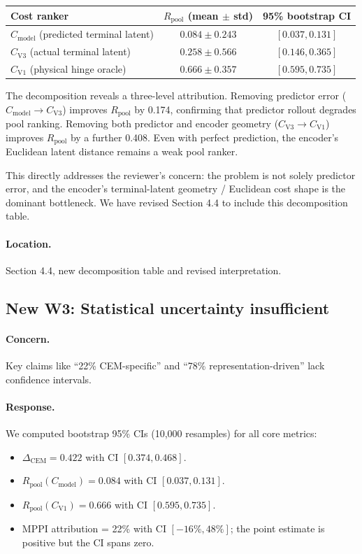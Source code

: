 \documentclass[11pt]{article}
\newcommand{\Rpool}{R_{\mathrm{pool}}}
\newcommand{\DeltaCEM}{\Delta_{\mathrm{CEM}}}
\newcommand{\Cmodel}{C_{\mathrm{model}}}
\newcommand{\CVone}{C_{\mathrm{V1}}}
\newcommand{\CVthree}{C_{\mathrm{V3}}}
\begin{document}
\begin{center}
\begin{tabular}{lcc}
\toprule
Cost ranker & $\Rpool$ (mean $\pm$ std) & 95\% bootstrap CI \\
\midrule
$\Cmodel$ (predicted terminal latent) & $0.084 \pm 0.243$ & $[0.037, 0.131]$ \\
$\CVthree$ (actual terminal latent) & $0.258 \pm 0.566$ & $[0.146, 0.365]$ \\
$\CVone$ (physical hinge oracle) & $0.666 \pm 0.357$ & $[0.595, 0.735]$ \\
\bottomrule
\end{tabular}
\end{center}

The decomposition reveals a three-level attribution. Removing predictor error ($\Cmodel \rightarrow \CVthree$) improves $\Rpool$ by 0.174, confirming that predictor rollout degrades pool ranking. Removing both predictor and encoder geometry ($\CVthree \rightarrow \CVone$) improves $\Rpool$ by a further 0.408. Even with perfect prediction, the encoder's Euclidean latent distance remains a weak pool ranker.

This directly addresses the reviewer's concern: the problem is not solely predictor error, and the encoder's terminal-latent geometry / Euclidean cost shape is the dominant bottleneck. We have revised Section 4.4 to include this decomposition table.

\paragraph{Location.}
Section 4.4, new decomposition table and revised interpretation.

\subsection*{New W3: Statistical uncertainty insufficient}

\paragraph{Concern.}
Key claims like ``22\% CEM-specific'' and ``78\% representation-driven'' lack confidence intervals.

\paragraph{Response.}
We computed bootstrap 95\% CIs (10,000 resamples) for all core metrics:
\begin{itemize}
  \item $\DeltaCEM = 0.422$ with CI $[0.374, 0.468]$.
  \item $\Rpool(\Cmodel) = 0.084$ with CI $[0.037, 0.131]$.
  \item $\Rpool(\CVone) = 0.666$ with CI $[0.595, 0.735]$.
  \item MPPI attribution = 22\% with CI $[-16\%, 48\%]$; the point estimate is positive but the CI spans zero.
\end{itemize}
\end{document}
